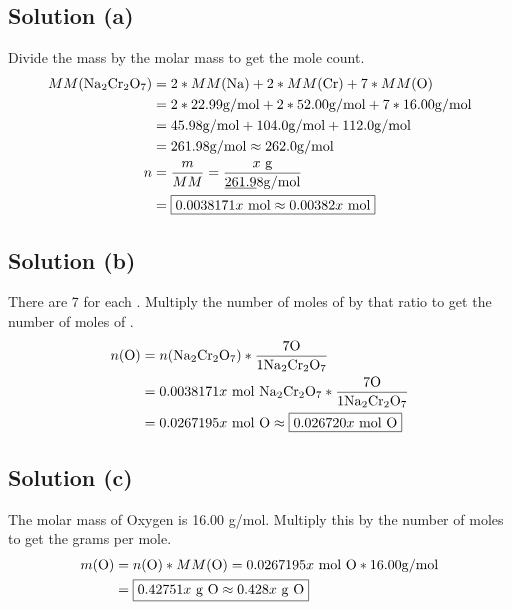 \documentclass[10pt]{article}
\begin{document}
        \subsection{Solution (a)}
            Divide the mass by the molar mass to get the mole count.
            \begin{align}
                MM(\ce{Na2Cr2O7})   &=  2 * MM(\ce{Na}) + 2 * MM(\ce{Cr}) + 7 * MM(\ce{O})\\
                    &=  2 * 22.99 \unit{\gram/\mole} + 2 * 52.00 \unit{\gram/\mole} + 7 * 16.00 \unit{\gram/\mole}\\
                    &=  45.98 \unit{\gram/\mole} + 104.0 \unit{\gram/\mole} + 112.0 \unit{\gram/\mole}\\
                    &=  261.98 \unit{\gram/\mole} \approx 262.0 \unit{\gram/\mole}\\
                n   &=  \frac{m}{MM}
                    =   \frac{x\ \unit{\gram}}{\underbar{261.9}8 \unit{\gram/\mole}}\\
                    &=  \boxed{0.0038171x\ \unit{\mole}
                    \approx 0.00382x\ \unit{\mole}}
            \end{align}

        \subsection{Solution (b)}
            There are 7  for each .
            Multiply the number of moles of  by that ratio to get the number of moles of .
            \begin{align}
                n(\ce{O})   &=  n(\ce{Na2Cr2O7}) * \frac{7 \ce{O}}{1 \ce{Na2Cr2O7}}\\
                    &=  0.0038171x\ \unit{\mole}\ \ce{Na2Cr2O7} * \frac{7 \ce{O}}{1 \ce{Na2Cr2O7}}\\
                    &=  0.0267195x\ \unit{\mole}\ \ce{O}
                    \approx \boxed{0.026720x\ \unit{\mole}\ \ce{O}}
            \end{align}
        
        \subsection{Solution (c)}
            The molar mass of Oxygen is 16.00 \unit{\gram/\mole}.
            Multiply this by the number of moles to get the grams per mole.
            \begin{align}
                m(\ce{O})   &=  n(\ce{O}) * MM(\ce{O})
                    =   0.0267195x\ \unit{\mole}\ \ce{O} * 16.00 \unit{\gram/\mole}\\
                    &=  \boxed{0.42751x\ \unit{\gram}\ \ce{O}
                    \approx 0.428x\ \unit{\gram}\ \ce{O}}
            \end{align}
\end{document}
